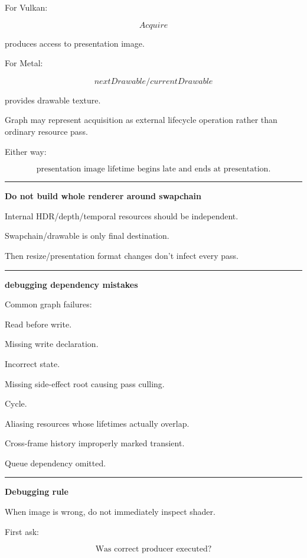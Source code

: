 For Vulkan:

\[
Acquire
\]

produces access to presentation image.

For Metal:

\[
nextDrawable/currentDrawable
\]

provides drawable texture.

Graph may represent acquisition as external lifecycle operation rather than ordinary resource pass.

Either way:

\[
\boxed{
\text{presentation image lifetime begins late and ends at presentation}.
}
\]

\begin{center}\rule{0.5\linewidth}{0.5pt}\end{center}

\textbf{Do not build whole renderer around swapchain}

Internal HDR/depth/temporal resources should be independent.

Swapchain/drawable is only final destination.

Then resize/presentation format changes don't infect every pass.

\begin{center}\rule{0.5\linewidth}{0.5pt}\end{center}

\textbf{debugging dependency mistakes}

Common graph failures:

Read before write.

Missing write declaration.

Incorrect state.

Missing side-effect root causing pass culling.

Cycle.

Aliasing resources whose lifetimes actually overlap.

Cross-frame history improperly marked transient.

Queue dependency omitted.

\begin{center}\rule{0.5\linewidth}{0.5pt}\end{center}

\textbf{Debugging rule}

When image is wrong, do not immediately inspect shader.

First ask:

\[
\boxed{
\text{Was correct producer executed?}
}
\]

